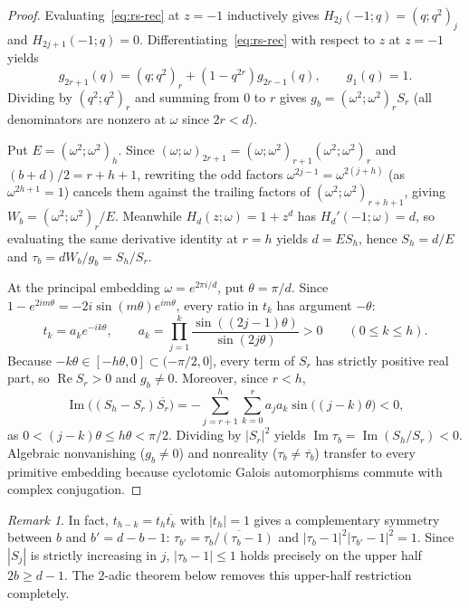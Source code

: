 \documentclass[11pt,reqno]{amsart}
\numberwithin{equation}{section}
\theoremstyle{definition}
\theoremstyle{remark}
\newtheorem{remark}[theorem]{Remark}
\newcommand{\poch}[3]{(#1;#2)_{#3}}
\begin{document}
\begin{proof}
Evaluating~\eqref{eq:rs-rec} at $z=-1$ inductively gives $H_{2j}(-1;q)=\poch{q}{q^2}{j}$ and $H_{2j+1}(-1;q)=0$. Differentiating~\eqref{eq:rs-rec} with respect to $z$ at $z=-1$ yields
\[
g_{2r+1}(q) = \poch{q}{q^2}{r} + (1-q^{2r})g_{2r-1}(q),\qquad g_1(q)=1.
\]
Dividing by $\poch{q^2}{q^2}{r}$ and summing from $0$ to $r$ gives $g_b=\poch{\omega^2}{\omega^2}{r}S_r$ (all denominators are nonzero at $\omega$ since $2r<d$).

Put $E=\poch{\omega^2}{\omega^2}{h}$. Since $\poch{\omega}{\omega}{2r+1} = \poch{\omega}{\omega^2}{r+1}\poch{\omega^2}{\omega^2}{r}$ and $(b+d)/2 = r+h+1$, rewriting the odd factors $\omega^{2j-1}=\omega^{2(j+h)}$ (as $\omega^{2h+1}=1$) cancels them against the trailing factors of $\poch{\omega^2}{\omega^2}{r+h+1}$, giving $W_b = \poch{\omega^2}{\omega^2}{r}/E$. Meanwhile $H_d(z;\omega)=1+z^d$ has $H_d'(-1;\omega)=d$, so evaluating the same derivative identity at $r=h$ yields $d = E S_h$, hence $S_h = d/E$ and $\tau_b = dW_b/g_b = S_h/S_r$.

At the principal embedding $\omega=e^{2\pi i/d}$, put $\theta=\pi/d$. Since $1-e^{2im\theta} = -2i\sin(m\theta)e^{im\theta}$, every ratio in $t_k$ has argument $-\theta$:
\begin{equation}
\label{eq:tk-polar}
t_k = a_k e^{-ik\theta},\qquad a_k = \prod_{j=1}^k \frac{\sin((2j-1)\theta)}{\sin(2j\theta)} > 0 \qquad (0\le k\le h).
\end{equation}
Because $-k\theta\in[-h\theta,0]\subset(-\pi/2,0]$, every term of $S_r$ has strictly positive real part, so $\operatorname{Re}S_r>0$ and $g_b\neq 0$. Moreover, since $r<h$,
\[
\operatorname{Im}\bigl((S_h-S_r)\overline{S_r}\bigr)
= -\sum_{j=r+1}^h \sum_{k=0}^r a_j a_k \sin\bigl((j-k)\theta\bigr) < 0,
\]
as $0<(j-k)\theta\le h\theta<\pi/2$. Dividing by $|S_r|^2$ yields $\operatorname{Im}\tau_b = \operatorname{Im}(S_h/S_r) < 0$. Algebraic nonvanishing ($g_b\neq 0$) and nonreality ($\tau_b\neq\overline{\tau_b}$) transfer to every primitive embedding because cyclotomic Galois automorphisms commute with complex conjugation.
\end{proof}

\begin{remark}
In fact, $t_{h-k}=t_h\overline{t_k}$ with $|t_h|=1$ gives a complementary symmetry between $b$ and $b'=d-b-1$: $\tau_{b'}=\overline{\tau_b/(\tau_b-1)}$ and $|\tau_b-1|^2|\tau_{b'}-1|^2=1$. Since $|S_j|$ is strictly increasing in $j$, $|\tau_b-1|\le 1$ holds precisely on the upper half $2b\ge d-1$. The $2$-adic theorem below removes this upper-half restriction completely.
\end{remark}
\end{document}

